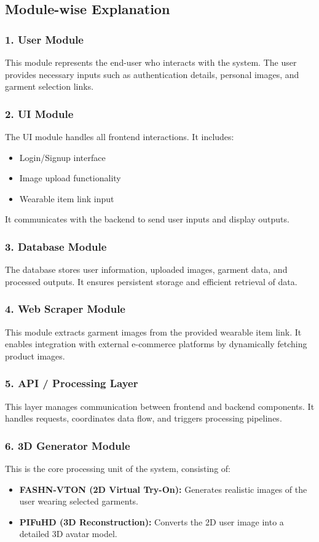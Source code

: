 \documentclass[12pt,a4paper,oneside]{report}
\begin{document}
\subsection{Module-wise Explanation}

\subsubsection{1. User Module}
This module represents the end-user who interacts with the system. The user provides necessary inputs such as authentication details, personal images, and garment selection links.

\subsubsection{2. UI Module}
The UI module handles all frontend interactions. It includes:
\begin{itemize}
    \item Login/Signup interface
    \item Image upload functionality
    \item Wearable item link input
\end{itemize}
It communicates with the backend to send user inputs and display outputs.

\subsubsection{3. Database Module}
The database stores user information, uploaded images, garment data, and processed outputs. It ensures persistent storage and efficient retrieval of data.

\subsubsection{4. Web Scraper Module}
This module extracts garment images from the provided wearable item link. It enables integration with external e-commerce platforms by dynamically fetching product images.

\subsubsection{5. API / Processing Layer}
This layer manages communication between frontend and backend components. It handles requests, coordinates data flow, and triggers processing pipelines.

\subsubsection{6. 3D Generator Module}
This is the core processing unit of the system, consisting of:
\begin{itemize}
    \item \textbf{FASHN-VTON (2D Virtual Try-On):} Generates realistic images of the user wearing selected garments.
    \item \textbf{PIFuHD (3D Reconstruction):} Converts the 2D user image into a detailed 3D avatar model.
\end{itemize}
\end{document}
